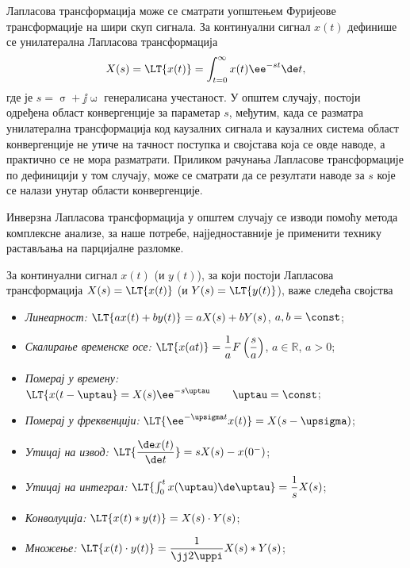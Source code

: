 Лапласова трансформација може се сматрати уопштењем Фуријеове трансформације на шири скуп сигнала. 
За континуални сигнал $x(t)$ дефинише се унилатерална Лапласова трансформација
\begin{equation}
    X(s) = \LT{x(t)} = \int_{t = 0}^\infty x(t) \ee^{-st} \de t, 
\end{equation}
где је $s = \upsigma + \jj\upomega$ генералисана учестаност. У општем случају, постоји одређена област конвергенције за 
параметар $s$, међутим, када се разматра унилатерална трансформација код каузалних сигнала и каузалних система област 
конвергенције не утиче на тачност поступка и својстава која се овде наводе, а практично се не мора разматрати. 
Приликом рачунања Лапласове трансформације по дефиницији у том случају, може се сматрати да се резултати наводе за $s$ 
које се налази унутар области конвергенције. 

Инверзна Лапласова трансформација у општем случају се изводи помоћу метода комплексне анализе, за наше потребе, најједноставније је 
применити технику растављања на парцијалне разломке.


За континуални сигнал $x(t)$ (и $y(t)$), за који постоји Лапласова трансформација
$X(s) = \LT{x(t)}$ (и $Y(s) = \LT{y(t)}$), важе следећа својства
\begin{itemize}\itemsep0pt
    \item \emph{Линеарност:} $\LT{ax(t) + by(t)} = a X(s) + b Y(s)$, \qquad $a,b = \const$;
    \item \emph{Скалирање временске осе:} $\LT{x(at)} = \dfrac{1}{a} F\left(\dfrac{s}{a}\right)$, \qquad $a \in \mathbb R$, $a > 0$; \hfill \Svojstvo
    \item \emph{Померај у времену:} $\LT{x(t-\uptau} = X(s)\ee^{-s\uptau} \qquad \uptau = \const$;  \hfill \Svojstvo
    \item \emph{Померај у фреквенцији:} $\LT{ \ee^{-\upsigma t} x(t) } = X(s - \upsigma)$; \hfill \Svojstvo \\
    \item \emph{Утицај на извод:} $ \LT{ \dfrac{\de x(t)}{\de t} } = s X(s) - x(0^-) $; \hfill \Svojstvo
    \item \emph{Утицај на интеграл:} $ \LT{ \int_0^t x(\uptau) \de \uptau } = \dfrac{1}{s} X(s)$; \hfill \Svojstvo
    \item \emph{Конволуција: } $\LT{x(t) \ast y(t)} = X(s) \cdot Y(s)$;  \hfill \Svojstvo
    \item \emph{Множење:} $\LT{ x(t) \cdot y(t) }  = \dfrac{1}{\jj2\uppi} X(s) \ast Y(s)$;  \hfill \Svojstvo
\end{itemize}

